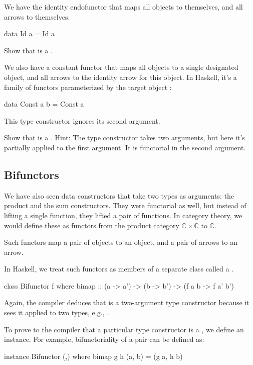 \documentclass[DaoFP]{subfiles}
\begin{document}
We have the identity endofunctor that maps all objects to themselves, and all arrows to themselves. 
\begin{haskell}
data Id a = Id a
\end{haskell}
\begin{exercise}
Show that  is a .
\end{exercise}


We also have a constant functor that maps all objects to a single designated object, and all arrows to the identity arrow for this object. In Haskell, it's a family of functors parameterized by the target object :
\begin{haskell}
data Const a b = Const a
\end{haskell}
This type constructor ignores its second argument.


\begin{exercise}
Show that  is a . Hint: The type constructor takes two arguments, but here it's partially applied to the first argument. It is functorial in the second argument.
\end{exercise}


\subsection{Bifunctors}

We have also seen data constructors that take two types as arguments: the product and the sum constructors. They were functorial as well, but instead of lifting a single function, they lifted a pair of functions. In category theory, we would define these as functors from the product category $\mathbb{C} \times \mathbb{C}$ to $\mathbb{C}$.

Such functors map a pair of objects to an object, and a pair of arrows to an arrow. 

In Haskell, we treat such functors as members of a separate class called a .

\begin{haskell}
class Bifunctor f where
  bimap :: (a -> a') -> (b -> b') -> (f a b -> f a' b')
\end{haskell}
Again, the compiler deduces that  is a two-argument type constructor because it sees it applied to two types, e.g., .

To prove to the compiler that a particular type constructor is a , we define an instance. For example, bifunctoriality of a pair can be defined as:
\begin{haskell}
instance Bifunctor (,) where
  bimap g h (a, b) = (g a, h b)
\end{haskell}
\end{document}
